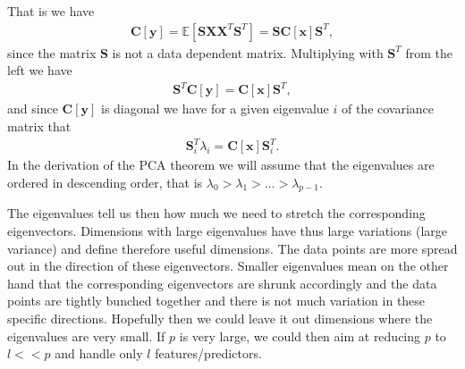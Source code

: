 \documentclass[letterpaper,10pt,english]{sphinxmanual}
\begin{document}
That is we have
\begin{equation*}
\begin{split}
\boldsymbol{C}[\boldsymbol{y}] = \mathbb{E}[\boldsymbol{S}\boldsymbol{X}\boldsymbol{X}^T\boldsymbol{S}^T]=\boldsymbol{S}\boldsymbol{C}[\boldsymbol{x}]\boldsymbol{S}^T,
\end{split}
\end{equation*}
since the matrix \(\boldsymbol{S}\) is not a data dependent matrix.   Multiplying with \(\boldsymbol{S}^T\) from the left we have
\begin{equation*}
\begin{split}
\boldsymbol{S}^T\boldsymbol{C}[\boldsymbol{y}] = \boldsymbol{C}[\boldsymbol{x}]\boldsymbol{S}^T,
\end{split}
\end{equation*}
and since \(\boldsymbol{C}[\boldsymbol{y}]\) is diagonal we have for a given eigenvalue \(i\) of the covariance matrix that
\begin{equation*}
\begin{split}
\boldsymbol{S}^T_i\lambda_i = \boldsymbol{C}[\boldsymbol{x}]\boldsymbol{S}^T_i.
\end{split}
\end{equation*}
In the derivation of the PCA theorem we will assume that the eigenvalues are ordered in descending order, that is
\(\lambda_0 > \lambda_1 > \dots > \lambda_{p-1}\).

The eigenvalues tell us then how much we need to stretch the
corresponding eigenvectors. Dimensions with large eigenvalues have
thus large variations (large variance) and define therefore useful
dimensions. The data points are more spread out in the direction of
these eigenvectors.  Smaller eigenvalues mean on the other hand that
the corresponding eigenvectors are shrunk accordingly and the data
points are tightly bunched together and there is not much variation in
these specific directions. Hopefully then we could leave it out
dimensions where the eigenvalues are very small. If \(p\) is very large,
we could then aim at reducing \(p\) to \(l << p\) and handle only \(l\)
features/predictors.
\end{document}
